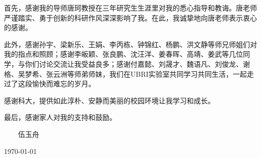 ﻿
\begin{thanks}

首先，感谢我的导师唐珂教授在三年研究生生涯里对我的悉心指导和教诲。唐老师严谨踏实、勇于创新的科研作风深深影响了我。在此，我诚挚地向唐老师表示衷心的感谢。

此外，感谢孙宇、梁新乐、王娟、李丙栋、钟锦红、杨鹏、洪文静等师兄师姐们对我的指点和照顾；感谢李皈颖、张良鹏、沈汪洋、姜春晖、高靖、姜武等几位同学，与你们讨论交流让我受益良多；感谢付嘉懿、刘晟才、魏语凡、刘俊龙、谢格、吴梦希、张云洲等师弟师妹，我们在UBRI实验室共同学习共同生活，一起走过了这段愉快而难忘的岁月。

感谢科大，提供如此淳朴、安静而美丽的校园环境让我学习和成长。

最后，感谢家人对我的支持和鼓励。

\vskip 18pt

\begin{flushright}

~~~~伍玉舟~~~~

\today

\end{flushright}

\end{thanks}
